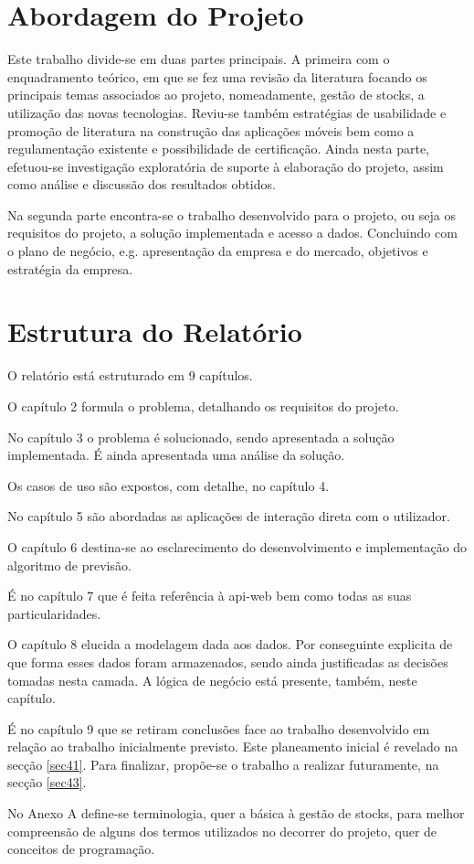 %
%
\section{Abordagem do Projeto} \label{sec13}

Este trabalho divide-se em duas partes principais. A primeira com o enquadramento teórico, em que se fez uma revisão da literatura focando os principais temas associados ao projeto, nomeadamente, gestão de stocks, a utilização das novas tecnologias. Reviu-se também estratégias de usabilidade e promoção de literatura na construção das aplicações móveis bem como a regulamentação existente e possibilidade de certificação.
Ainda nesta parte, efetuou-se investigação exploratória de suporte à elaboração do projeto, assim como análise e discussão dos resultados obtidos.

Na segunda parte encontra-se o trabalho desenvolvido para o projeto, ou seja os requisitos do projeto, a solução implementada e acesso a dados. Concluindo com o plano de negócio, e.g. apresentação da empresa e do mercado, objetivos e estratégia da empresa.


%
%
\section{Estrutura do Relatório} \label{sec14}
O relatório está estruturado em 9 capítulos.

O capítulo 2 formula o problema, detalhando os requisitos do projeto. 

No capítulo 3 o problema é solucionado, sendo apresentada a solução implementada. É ainda apresentada uma análise da solução.

Os casos de uso são expostos, com detalhe, no capítulo 4.

No capítulo 5 são abordadas as aplicações de interação direta com o utilizador.

O capítulo 6 destina-se ao esclarecimento do desenvolvimento e implementação do algoritmo de previsão.

É no capítulo 7 que é feita referência à \gls{api-web} bem como todas as suas particularidades.

O capítulo 8 elucida a modelagem dada aos dados. Por conseguinte explicita de que forma esses dados foram armazenados, sendo ainda justificadas as decisões tomadas nesta camada. A lógica de negócio está presente, também, neste capítulo. 

É no capítulo 9 que se retiram conclusões face ao trabalho desenvolvido em relação ao trabalho inicialmente previsto. Este planeamento inicial é revelado na secção \ref{sec41}. Para finalizar, propõe-se o trabalho a realizar futuramente, na secção \ref{sec43}.

No Anexo A define-se terminologia, quer a básica à gestão de stocks, para melhor compreensão de alguns dos termos utilizados no decorrer do projeto, quer de conceitos de programação.

